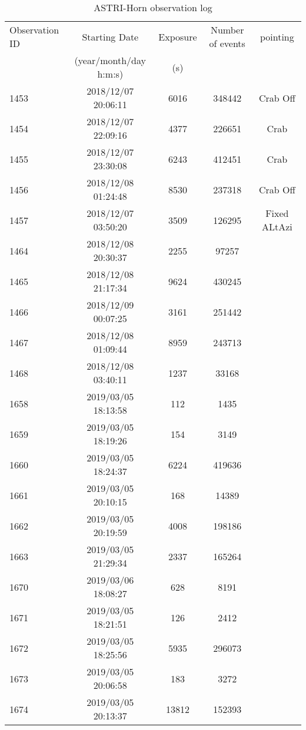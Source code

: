 \begin{table}[ht]
\label{tab:astrilog}
\caption{ASTRI-Horn observation log}
\centering
\begin{tabular}{lcccc}
\hline\hline
Observation ID & Starting Date & Exposure      & Number of events & pointing \\
               & (year/month/day h:m:s) & (s)  \\
\hline     
1453 & 2018/12/07 20:06:11  &   6016     & 348442 & Crab Off    \\
1454 & 2018/12/07 22:09:16  &   4377     & 226651 &  Crab \\ %
1455 & 2018/12/07 23:30:08  &   6243     & 412451 &  Crab \\ %
1456 & 2018/12/08 01:24:48  &  8530     & 237318 & Crab Off \\ %
1457 & 2018/12/07 03:50:20  &  3509     & 126295 & Fixed ALtAzi\\ %
1464 & 2018/12/08 20:30:37 &  2255 & 97257 & \\ %
1465 & 2018/12/08 21:17:34 &  9624 & 430245 & \\ %
1466 & 2018/12/09 00:07:25 &  3161 & 251442 & \\ %
1467 & 2018/12/08 01:09:44 &  8959 & 243713 & \\  %
1468 & 2018/12/08 03:40:11 &  1237 & 33168 & \\ %
1658 & 2019/03/05 18:13:58 &  112 & 1435 & \\  
1659 & 2019/03/05 18:19:26 &  154 & 3149 & \\  
1660 & 2019/03/05 18:24:37 &  6224  & 419636 & \\ %
1661 & 2019/03/05 20:10:15 &  168 & 14389 & \\  
1662 & 2019/03/05 20:19:59 &  4008 & 198186 & \\   
1663 & 2019/03/05 21:29:34 &  2337 & 165264 & \\  
1670 & 2019/03/06 18:08:27 &  628    &   8191      & \\
1671 & 2019/03/05 18:21:51 &  126        &   2412   & \\
1672 & 2019/03/05 18:25:56 &  5935    &   296073   & \\ %
1673 & 2019/03/05 20:06:58 &  183      &   3272     & \\ %
1674 & 2019/03/05 20:13:37 &  13812      &    152393 & \\ %

\hline\hline
\end{tabular}
\end{table}

